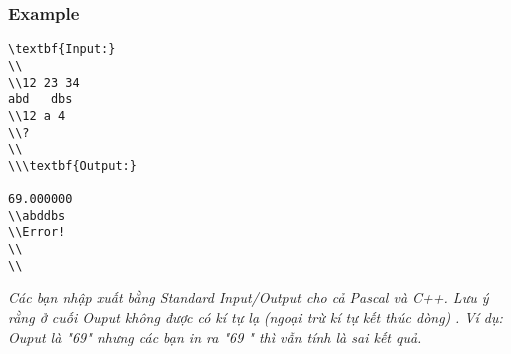 \subsubsection{   Example  }
\begin{verbatim}
\textbf{Input:}
\\
\\12 23 34
abd   dbs
\\12 a 4 
\\?
\\
\\\textbf{Output:}

69.000000
\\abddbs
\\Error! 
\\
\\\end{verbatim}

\emph{    Các bạn nhập xuất bằng Standard Input/Output cho cả Pascal và C++. Lưu ý rằng ở cuối Ouput không được có kí tự lạ   }\emph{    (ngoại trừ kí tự kết thúc dòng)   }\emph{    . Ví dụ: Ouput là "69" nhưng các bạn in ra "69 " thì vẫn tính là sai kết quả.   }

